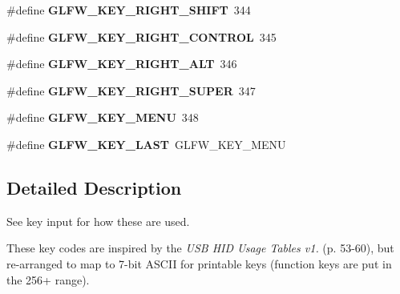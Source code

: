 \begin{DoxyCompactItemize}
\item 
\hypertarget{group__keys_gaffca36b99c9dce1a19cb9befbadce691}{}\#define {\bfseries G\+L\+F\+W\+\_\+\+K\+E\+Y\+\_\+\+R\+I\+G\+H\+T\+\_\+\+S\+H\+I\+F\+T}~344\label{group__keys_gaffca36b99c9dce1a19cb9befbadce691}

\item 
\hypertarget{group__keys_gad1ca2094b2694e7251d0ab1fd34f8519}{}\#define {\bfseries G\+L\+F\+W\+\_\+\+K\+E\+Y\+\_\+\+R\+I\+G\+H\+T\+\_\+\+C\+O\+N\+T\+R\+O\+L}~345\label{group__keys_gad1ca2094b2694e7251d0ab1fd34f8519}

\item 
\hypertarget{group__keys_ga687b38009131cfdd07a8d05fff8fa446}{}\#define {\bfseries G\+L\+F\+W\+\_\+\+K\+E\+Y\+\_\+\+R\+I\+G\+H\+T\+\_\+\+A\+L\+T}~346\label{group__keys_ga687b38009131cfdd07a8d05fff8fa446}

\item 
\hypertarget{group__keys_gad4547a3e8e247594acb60423fe6502db}{}\#define {\bfseries G\+L\+F\+W\+\_\+\+K\+E\+Y\+\_\+\+R\+I\+G\+H\+T\+\_\+\+S\+U\+P\+E\+R}~347\label{group__keys_gad4547a3e8e247594acb60423fe6502db}

\item 
\hypertarget{group__keys_ga9845be48a745fc232045c9ec174d8820}{}\#define {\bfseries G\+L\+F\+W\+\_\+\+K\+E\+Y\+\_\+\+M\+E\+N\+U}~348\label{group__keys_ga9845be48a745fc232045c9ec174d8820}

\item 
\hypertarget{group__keys_ga442cbaef7bfb9a4ba13594dd7fbf2789}{}\#define {\bfseries G\+L\+F\+W\+\_\+\+K\+E\+Y\+\_\+\+L\+A\+S\+T}~G\+L\+F\+W\+\_\+\+K\+E\+Y\+\_\+\+M\+E\+N\+U\label{group__keys_ga442cbaef7bfb9a4ba13594dd7fbf2789}

\end{DoxyCompactItemize}


\subsection{Detailed Description}
See key input for how these are used.

These key codes are inspired by the {\itshape U\+S\+B H\+I\+D Usage Tables v1.} (p. 53-\/60), but re-\/arranged to map to 7-\/bit A\+S\+C\+I\+I for printable keys (function keys are put in the 256+ range).

